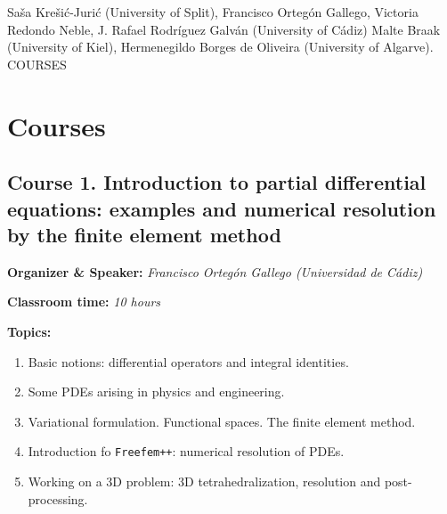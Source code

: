 \documentclass[letterpaper]{inzane_syllabus} %
\begin{document}
Saša Krešić-Jurić (University of Split), Francisco Ortegón Gallego, Victoria Redondo Neble, J. Rafael Rodríguez Galván (University of Cádiz) Malte Braak (University of Kiel), Hermenegildo Borges de Oliveira (University of Algarve). 
                COURSES
\newpage
\makeFullPage

\newcommand{\block}[2]{\par\textbf{#1:} \textit{#2}}

\section{Courses}
\subsection{Course 1. Introduction to partial differential equations: examples and numerical resolution by the finite element method}
\block{Organizer \& Speaker}{Francisco Ortegón Gallego (Universidad de Cádiz)}
\block{Classroom time}{10 hours}
\block{Topics}{}
\begin{enumerate}
  \item Basic notions: differential operators and integral identities. 
  \item Some PDEs arising in physics and engineering.
  \item Variational formulation. Functional spaces. The finite element method.
  \item Introduction fo \texttt{Freefem++}: numerical resolution of PDEs.
  \item Working on a 3D problem: 3D tetrahedralization, resolution and 
  post-processing.
\end{enumerate} 
\end{document}
